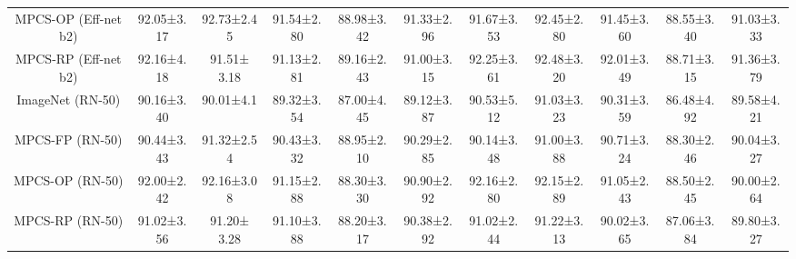 \documentclass[conference]{IEEEtran}
\begin{document}
\begin{table*}[h]
\begin{adjustbox}{max width=\textwidth}
\begin{tabular}{c|cccc|c|cccc|c}
MPCS-OP (Eff-net b2)     & \multicolumn{1}{c|}{92.05±3.17} & \multicolumn{1}{c|}{92.73±2.45}                         & \multicolumn{1}{c|}{{\color[HTML]{1E1E1E} 91.54±2.80}} & {\color[HTML]{1E1E1E} 88.98±3.42} & 91.33±2.96             & \multicolumn{1}{c|}{91.67±3.53} & \multicolumn{1}{c|}{92.45±2.80} & \multicolumn{1}{c|}{91.45±3.60} & 88.55±3.40 & 91.03±3.33             \\
MPCS-RP (Eff-net b2)     & \multicolumn{1}{c|}{92.16±4.18} & \multicolumn{1}{c|}{{\color[HTML]{1E1E1E} 91.51± 3.18}} & \multicolumn{1}{c|}{{\color[HTML]{1E1E1E} 91.13±2.81}} & {\color[HTML]{1E1E1E} 89.16±2.43} & 91.00±3.15             & \multicolumn{1}{c|}{92.25±3.61} & \multicolumn{1}{c|}{92.48±3.20} & \multicolumn{1}{c|}{92.01±3.49} & 88.71±3.15 & 91.36±3.79             \\
ImageNet (RN-50)         & \multicolumn{1}{c|}{90.16±3.40} & \multicolumn{1}{c|}{90.01±4.1}                          & \multicolumn{1}{c|}{89.32±3.54}                        & 87.00±4.45                        & 89.12±3.87             & \multicolumn{1}{c|}{90.53±5.12} & \multicolumn{1}{c|}{91.03±3.23} & \multicolumn{1}{c|}{90.31±3.59} & 86.48±4.92 & 89.58±4.21             \\
MPCS-FP (RN-50)          & \multicolumn{1}{c|}{90.44±3.43} & \multicolumn{1}{c|}{91.32±2.54}                         & \multicolumn{1}{c|}{90.43±3.32}                        & 88.95±2.10                        & 90.29±2.85             & \multicolumn{1}{c|}{90.14±3.48} & \multicolumn{1}{c|}{91.00±3.88} & \multicolumn{1}{c|}{90.71±3.24} & 88.30±2.46 & 90.04±3.27             \\
MPCS-OP (RN-50)          & \multicolumn{1}{c|}{92.00±2.42} & \multicolumn{1}{c|}{92.16±3.08}                         & \multicolumn{1}{c|}{{\color[HTML]{1E1E1E} 91.15±2.88}} & {\color[HTML]{1E1E1E} 88.30±3.30} & 90.90±2.92             & \multicolumn{1}{c|}{92.16±2.80} & \multicolumn{1}{c|}{92.15±2.89} & \multicolumn{1}{c|}{91.05±2.43} & 88.50±2.45 & 90.00±2.64             \\
MPCS-RP (RN-50)          & \multicolumn{1}{c|}{91.02±3.56} & \multicolumn{1}{c|}{{\color[HTML]{1E1E1E} 91.20± 3.28}} & \multicolumn{1}{c|}{{\color[HTML]{1E1E1E} 91.10±3.88}} & {\color[HTML]{1E1E1E} 88.20±3.17} & 90.38±2.92             & \multicolumn{1}{c|}{91.02±2.44} & \multicolumn{1}{c|}{91.22±3.13} & \multicolumn{1}{c|}{90.02±3.65} & 87.06±3.84 & 89.80±3.27             \\ \hline
\end{tabular}
\end{adjustbox}

\end{table*}
\end{document}
